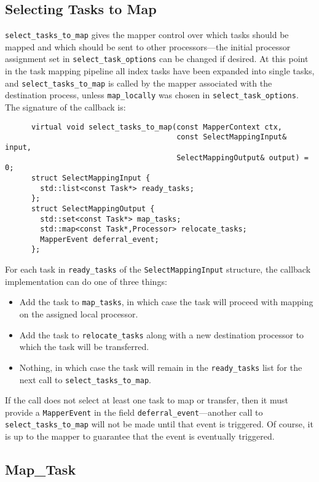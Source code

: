\subsection{Selecting Tasks to Map}
{\tt select\_tasks\_to\_map} gives the mapper control over which tasks should be mapped and which should be sent to other processors---the initial processor assignment set in {\tt select\_task\_options} can be changed if desired.  At this point
in the task mapping pipeline all index tasks have been expanded into single tasks, and {\tt select\_tasks\_to\_map} is called by the mapper associated with the destination process, unless {\tt map\_locally} was chosen in {\tt select\_task\_options}.
The signature of the callback is:
\begin{lstlisting}
      virtual void select_tasks_to_map(const MapperContext ctx,
                                       const SelectMappingInput& input,
                                       SelectMappingOutput& output) = 0;
      struct SelectMappingInput {
        std::list<const Task*> ready_tasks;
      };
      struct SelectMappingOutput {
        std::set<const Task*> map_tasks;
        std::map<const Task*,Processor> relocate_tasks;
        MapperEvent deferral_event;
      };
\end{lstlisting}
For each task in {\tt ready\_tasks} of the {\tt SelectMappingInput} structure, the callback implementation can do one of three things:
\begin{itemize}
\item Add the task to {\tt map\_tasks}, in which case the task will proceed with mapping on the assigned local processor.
\item Add the task to {\tt relocate\_tasks} along with a new destination processor to which the task will be transferred.
\item Nothing, in which case the task will remain in the {\tt ready\_tasks} list for the next call to {\tt select\_tasks\_to\_map}.
\end{itemize}
If the call does not select at least one task to map or transfer, then it must provide a {\tt MapperEvent} in the field {\tt deferral\_event}---another call to {\tt select\_tasks\_to\_map} will not be made until that event is triggered.
Of course, it is up to the mapper to guarantee that the event is eventually triggered.

\subsection{Map\_Task}
\label{subsec:maptask}

